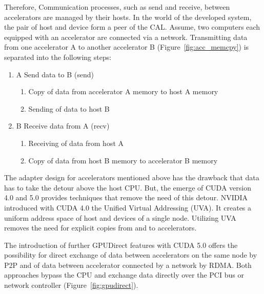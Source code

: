 Therefore, Communication processes, such as send and receive,
between accelerators are managed by their hosts. In the world of the
developed system, the pair of host and device form a peer of the
CAL. Assume, two computers each equipped with an accelerator are
connected via a network. Transmitting data from one accelerator A to
another accelerator B (Figure~\ref{fig:acc_memcpy}) is separated into the following steps:

\begin{enumerate}
\item A Send data to B (send)
  \begin{enumerate}
  \item Copy of data from accelerator A memory to host A memory
  \item Sending of data to host B
  \end{enumerate}
\item B Receive data from A (recv)
  \begin{enumerate}
  \item Receiving of data from host A
  \item Copy of data from host B memory to accelerator B memory
  \end{enumerate}
\end{enumerate}

\noindent The adapter design for accelerators mentioned above has the
drawback that data has to take the detour above the host CPU. But, the
emerge of CUDA version 4.0 and 5.0 provides techniques that remove the
need of this detour. NVIDIA introduced with CUDA 4.0 the Unified
Virtual Addressing (UVA).  It creates a uniform address space of host
and devices of a single node. Utilizing UVA removes the need for
explicit copies from and to accelerators.

The introduction of further GPUDirect features with CUDA 5.0 offers
the possibility for direct exchange of data between accelerators on
the same node by P2P and of data between accelerator connected by a
network by RDMA.  Both approaches bypass the CPU and exchange data
directly over the PCI bus or network controller
(Figure~\ref{fig:gpudirect}).

